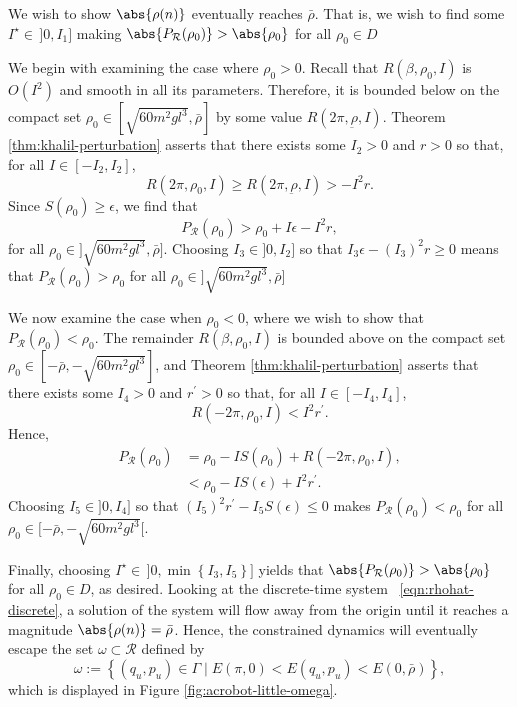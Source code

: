 We wish to show \(\abs{\rho(n)}\) eventually reaches \(\bar{\rho}\).
That is, we wish to find some \(I^\star \in \,]0,I_1]\) making
\(\abs{P_\mathcal{R}(\rho_0)} > \abs{\rho_0}\) for all 
\(\rho_0 \in D\)

We begin with examining the case where \(\rho_0 > 0\).
Recall that \(R(\beta,\rho_0,I)\) is \(O(I^2)\) and smooth in all
its parameters.
Therefore, it is bounded below on the compact set
\(\rho_0 \in [\sqrt{60m^2gl^3},\bar{\rho}]\) by some value
\(R(2\pi,\underbar{\rho},I)\).
Theorem \ref{thm:khalil-perturbation} asserts that there exists some 
\(I_2 > 0\) and \(r > 0\) so that, for all \(I \in [-I_2,I_2]\),
\[
    R(2\pi,\rho_0,I) \geq R(2\pi,\underbar{\rho},I) > -I^2r
    .
\]
Since \(S(\rho_0) \geq \epsilon\), we find that
\[
    P_\mathcal{R}(\rho_0) > \rho_0 + I\epsilon -I^2r
    ,
\]
for all \(\rho_0 \in ]\sqrt{60m^2gl^3},\bar{\rho}]\).
Choosing \(I_3 \in ]0,I_2]\) so that 
\(I_3\epsilon - (I_3)^2 r \geq 0\) means that
\(P_\mathcal{R}(\rho_0) > \rho_0\)
for all \(\rho_0 \in ]\sqrt{60m^2gl^3},\bar{\rho}]\)

We now examine the case when \(\rho_0 < 0\), where we wish to show that 
\(P_\mathcal{R}(\rho_0) < \rho_0\).
The remainder \(R(\beta,\rho_0,I)\) is bounded above on the compact set 
\(\rho_0 \in [-\bar{\rho},-\sqrt{60m^2gl^3}]\), and 
Theorem \ref{thm:khalil-perturbation} asserts that there exists some 
\(I_4 > 0\) and \(r^\prime > 0\) so that, for all \(I \in [-I_4,I_4]\), 
\[
    R(-2\pi,\rho_0,I) < I^2 r^\prime
    .
\]
Hence,
\begin{align*}
    P_\mathcal{R}(\rho_0)
    &= \rho_0 - IS(\rho_0) + R(-2\pi,\rho_0,I)
    , \\
    &< \rho_0 - IS(\epsilon) + I^2r^\prime
    .
\end{align*}
Choosing \(I_5 \in ]0,I_4]\) so that 
\((I_5)^2r^\prime - I_5 S(\epsilon) \leq 0\) makes
\(P_\mathcal{R}(\rho_0) < \rho_0\) for all 
\(\rho_0 \in [-\bar{\rho},-\sqrt{60m^2gl^3}[\).

Finally, choosing \(I^\star \in\, ]0,\min\left\{I_3,I_5\right\}]\) yields that
\(\abs{P_\mathcal{R}(\rho_0)} > \abs{\rho_0}\) for all \(\rho_0 \in D\), as
desired.
Looking at the discrete-time system ~\eqref{eqn:rhohat-discrete}, 
a solution of the system will flow away from the origin until it reaches a
magnitude \(\abs{\rho(n)} = \bar{\rho}\).
Hence, the constrained dynamics will eventually escape the set
\(\omega \subset \mathcal{R}\) defined by
\[
    \omega := \left\{(q_u,p_u) \in \Gamma
    \mid E(\pi,0) < E(q_u,p_u) < E(0,\bar{\rho}) \right\}
    ,
\]
which is displayed in Figure \ref{fig:acrobot-little-omega}.

